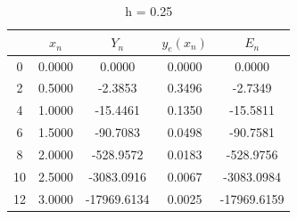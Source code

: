 \documentclass[11pt]{article}
\begin{document}
\begin{table}[!htb]
\centering
\caption{h = 0.25}                                     
\begin{tabular}{|c|c|c|c|c|}               
\hline                                     
 & $x_{n}$ & $Y_{n} $& $y_{e}(x_{n})$ & $E_{n}$\\               
\hline                                     
0 & 0.0000 & 0.0000 & 0.0000 & 0.0000 \\           
\hline                                             
2 & 0.5000 & -2.3853 & 0.3496 & -2.7349 \\         
\hline                                                                                        
4 & 1.0000 & -15.4461 & 0.1350 & -15.5811 \\       
\hline                                                                                          
6 & 1.5000 & -90.7083 & 0.0498 & -90.7581 \\       
\hline                                                                                      
8 & 2.0000 & -528.9572 & 0.0183 & -528.9756 \\         
\hline                                             
10 & 2.5000 & -3083.0916 & 0.0067 & -3083.0984 \\  
\hline                                                                                       
12 & 3.0000 & -17969.6134 & 0.0025 & -17969.6159 \\
\hline                                                
\end{tabular}                              
\end{table}
\end{document}
